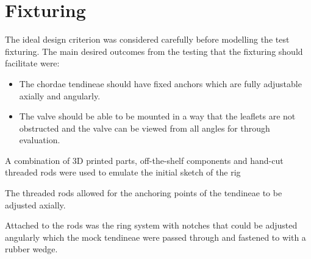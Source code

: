 \section{Fixturing}
The ideal design criterion was considered carefully before modelling the test fixturing. The main desired outcomes from the testing that the fixturing should facilitate were:

\begin{itemize}
  \item The chordae tendineae should have fixed anchors which are fully adjustable axially and angularly.
  \item The valve should be able to be mounted in a way that the leaflets are not obstructed and the valve can be viewed from all angles for through evaluation.
\end{itemize}

A combination of 3D printed parts, off-the-shelf components and hand-cut threaded rods were used to emulate the initial sketch of the rig

The threaded rods allowed for the anchoring points of the tendineae to be adjusted axially.

Attached to the rods was the ring system with notches that could be adjusted angularly which the mock tendineae were passed through and fastened to with a rubber wedge.